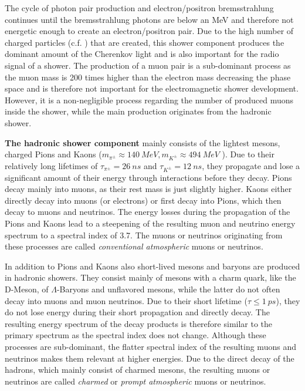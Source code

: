 The cycle of photon pair production and electron/positron bremsstrahlung continues until the bremsstrahlung photons are below an MeV and therefore not energetic enough to create an electron/positron pair.
Due to the high number of charged particles (c.f. ) that are created, this shower component produces the dominant amount of the Cherenkov light and is also important for the radio signal of a shower.
The production of a muon pair is a sub-dominant process as the muon mass is 200 times higher than the electron mass decreasing the phase space and is therefore not important for the electromagnetic shower development.
However, it is a non-negligible process regarding the number of produced muons inside the shower, while the main production originates from the hadronic shower.

\textbf{The hadronic shower component} mainly consists of the lightest mesons, charged Pions and Kaons ($m_{\pi^{\pm}} \approx \SI{140}{MeV}, m_{K^{\pm}} \approx \SI{494}{MeV}$ \cite{PDG20}).
Due to their relatively long lifetimes of $\tau_{\pi^{\pm}} = \SI{26}{ns}$ and $\tau_{K^{\pm}} = \SI{12}{ns}$, they propagate and lose a significant amount of their energy through interactions before they decay.
Pions decay mainly into muons, as their rest mass is just slightly higher.
Kaons either directly decay into muons (or electrons) or first decay into Pions, which then decay to muons and neutrinos.
The energy losses during the propagation of the Pions and Kaons lead to a steepening of the resulting muon and neutrino energy spectrum to a spectral index of \num{3.7}.
The muons or neutrinos originating from these processes are called \textit{conventional atmospheric} muons or neutrinos.

In addition to Pions and Kaons also short-lived mesons and baryons are produced in hadronic showers.
They consist mainly of mesons with a charm quark, like the D-Meson, of $\Lambda$-Baryons and unflavored mesons, while the latter do not often decay into muons and muon neutrinos.
Due to their short lifetime ($\tau \leq \SI{1}{ps}$), they do not lose energy during their short propagation and directly decay.
The resulting energy spectrum of the decay products is therefore similar to the primary spectrum as the spectral index does not change.
Although these processes are sub-dominant, the flatter spectral index of the resulting muons and neutrinos makes them relevant at higher energies.
Due to the direct decay of the hadrons, which mainly consist of charmed mesons, the resulting muons or neutrinos are called \textit{charmed} or \textit{prompt atmospheric} muons or neutrinos.

